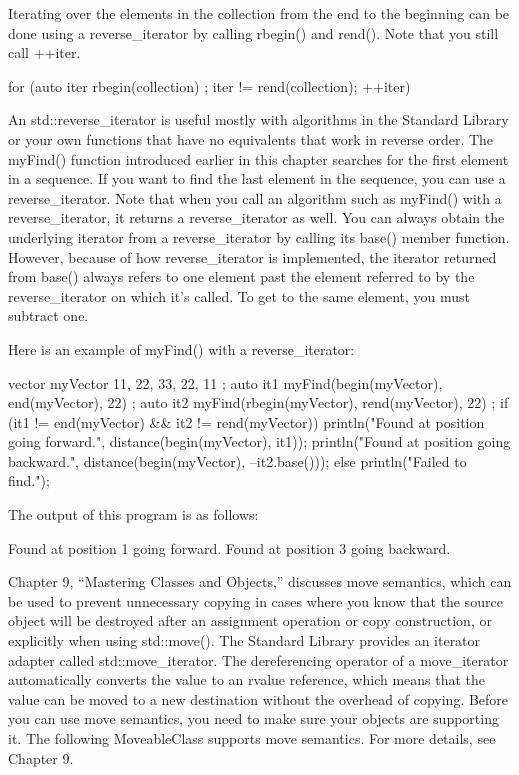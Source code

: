 Iterating over the elements in the collection from the end to the beginning can be done using a reverse\_iterator by calling rbegin() and rend(). Note that you still call ++iter.

\begin{cpp}
for (auto iter { rbegin(collection) }; iter != rend(collection); ++iter) {}
\end{cpp}

An std::reverse\_iterator is useful mostly with algorithms in the Standard Library or your own functions that have no equivalents that work in reverse order. The myFind() function introduced earlier in this chapter searches for the first element in a sequence. If you want to find the last element in the sequence, you can use a reverse\_iterator. Note that when you call an algorithm such as myFind() with a reverse\_iterator, it returns a reverse\_iterator as well. You can always obtain the underlying iterator from a reverse\_iterator by calling its base() member function. However, because of how reverse\_iterator is implemented, the iterator returned from base() always refers to one element past the element referred to by the reverse\_iterator on which it’s called. To get to the same element, you must subtract one.

Here is an example of myFind() with a reverse\_iterator:

\begin{cpp}
vector myVector { 11, 22, 33, 22, 11 };
auto it1 { myFind(begin(myVector), end(myVector), 22) };
auto it2 { myFind(rbegin(myVector), rend(myVector), 22) };
if (it1 != end(myVector) && it2 != rend(myVector)) {
    println("Found at position {} going forward.",
             distance(begin(myVector), it1));
    println("Found at position {} going backward.",
             distance(begin(myVector), --it2.base()));
} else {
    println("Failed to find.");
}
\end{cpp}

The output of this program is as follows:

\begin{shell}
Found at position 1 going forward.
Found at position 3 going backward.
\end{shell}


Chapter 9, “Mastering Classes and Objects,” discusses move semantics, which can be used to prevent unnecessary copying in cases where you know that the source object will be destroyed after an assignment operation or copy construction, or explicitly when using std::move(). The Standard Library provides an iterator adapter called std::move\_iterator. The dereferencing operator of a move\_iterator automatically converts the value to an rvalue reference, which means that the value can be moved to a new destination without the overhead of copying. Before you can use move semantics, you need to make sure your objects are supporting it. The following MoveableClass supports move semantics. For more details, see Chapter 9.

